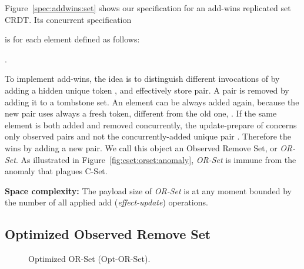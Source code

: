 \documentclass[a4paper]{article}
\begin{document}
Figure~\ref{spec:addwins:set} shows our specification for an add-wins
replicated set CRDT\@.
Its concurrent specification 

is for each element  defined as follows:
\begin{compactitem}
\item
  
\item
  .
\end{compactitem}

To implement add-wins, the idea is to distinguish different invocations of
 by adding a hidden unique token , and effectively store  pair.  A pair  is removed by adding it to a tombstone set.  An
element can be always added again, because the new pair  uses
always a fresh token, different from the old one, .  If the same
element  is both added and removed concurrently, the update-prepare of
\remove concerns only observed pairs  and not
the concurrently-added unique pair .  Therefore the \add wins by
adding a new pair.  We call this object an Observed Remove Set, or
\emph{OR-Set}.  As illustrated in Figure~\ref{fig:cset:orset:anomaly},
\emph{OR-Set} is immune from the anomaly that plagues {C-Set}.

{\bf Space complexity:} The payload size of \emph{OR-Set} is at any moment
bounded by the number of all applied add (\emph{effect-update}) operations.

\subsection{Optimized Observed Remove Set}

\begin{figure}[h!]
\caption{Optimized OR-Set (Opt-OR-Set).\label{spec:addwins:set:notombs}}
\begin{algorithmic}
    
\State    {}
    \Initial{}
        \Let{}
        \EndQuery
      \Let{}
    \EndQuery
        \AtSource{}
            \Let{}
            \Let{}
            \EndAtSource
        \Downstream{}
            \If{}
                \Let{}
                \State{}
                \State{}
\EndIf
            \EndDownstream
        \EndUpdate
        \AtSource{}
\Let{}
            \EndAtSource
        \Downstream{} 
\State{} 
\EndDownstream
        \EndUpdate
    \LEML{}{}
\Let{}
    	\Let{} \Let{}
        \EndLEML
    \MergeML{}
        \Let{}
        \Let{}
\Let{}
\Let{}
        \Let{}
        \State{}
        \State{}
\EndMergeML
  \end{algorithmic}
  \end{figure}
\end{document}
